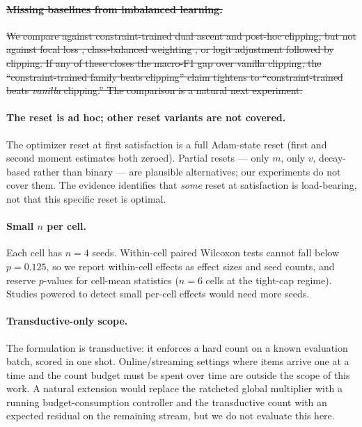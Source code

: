 \documentclass[10pt]{article}
\newcommand{\del}[1]{{\color{red}\sout{#1}}}
\begin{document}
\paragraph{\del{Missing baselines from imbalanced learning.}}\leavevmode
\del{We compare against constraint-trained dual ascent and post-hoc clipping,
but not against focal loss \mbox{\citep{lin2017focal}}, class-balanced weighting
\mbox{\citep{cui2019class}}, or logit adjustment \mbox{\citep{menon2020long}} followed
by clipping. If any of these closes the macro-F1 gap over vanilla
clipping, the ``constraint-trained family beats clipping'' claim
tightens to ``constraint-trained beats \emph{vanilla} clipping.''
The comparison is a natural next experiment.}

\paragraph{The reset is ad hoc; other reset variants are not covered.}
The optimizer reset at first satisfaction is a full Adam-state reset
(first and second moment estimates both zeroed). Partial resets --- only
$m$, only $v$, decay-based rather than binary --- are plausible
alternatives; our experiments do not cover them. The evidence identifies
that \emph{some} reset at satisfaction is load-bearing, not that this
specific reset is optimal.

\paragraph{Small $n$ per cell.}
Each cell has $n{=}4$ seeds. Within-cell paired Wilcoxon tests cannot
fall below $p{=}0.125$, so we report within-cell effects as effect sizes
and seed counts, and reserve $p$-values for cell-mean statistics ($n{=}6$
cells at the tight-cap regime). Studies powered to detect small
per-cell effects would need more seeds.

\paragraph{Transductive-only scope.}
The formulation is transductive: it enforces a hard count on a known
evaluation batch, scored in one shot. Online/streaming settings where
items arrive one at a time and the count budget must be spent over time
are outside the scope of this work. A natural extension would replace
the ratcheted global multiplier with a running budget-consumption
controller and the transductive count with an expected residual on the
remaining stream, but we do not evaluate this here.
\end{document}
